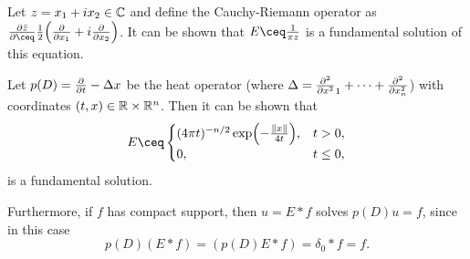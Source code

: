 \begin{example}
	Let $z = x_1 + i x_2 \in \mathbb C$ and define the Cauchy-Riemann operator as $\pdv{\bar z} \ceq \frac12 \qty(\pdv{x_1} + i \pdv{x_2})$. 
	It can be shown that $E \ceq \frac1{\pi z}$ is a fundamental solution of this equation. 
\end{example}

\begin{example}
	Let $p(D) = \pdv{t} - \Delta x$ be the heat operator (where $\Delta = \pdv[2]x_1 + \dotsb + \pdv[2]{x_n}$) with coordinates $(t, x) \in \mathbb R \times \mathbb R^n$. Then it can be shown that
	\[
	E \ceq \begin{cases}
		(4\pi t)^{-n/2} \exp(-\frac{\norm{x}}{4t}), &t > 0, \\ 0, & t \leq 0,
	\end{cases}
	\]
	is a fundamental solution. 
	
	Furthermore, if $f$ has compact support, then $u = E * f$ solves $p(D) u = f$, since in this case
	\[
	p(D)(E * f) = (p(D) E * f) = \delta_0 * f = f. 
	\]
\end{example}